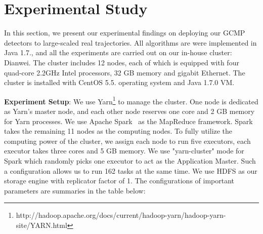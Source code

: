 \section{Experimental Study}
\label{sec:exp}
In this section, we present our experimental findings on
deploying our GCMP detectors to large-scaled real trajectories.
All algorithms are were implemented in Java 1.7., and all the 
experiments are carried out on our in-house cluster: Dianwei. The cluster
includes 12 nodes, each of which is equipped with four quad-core 2.2GHz Intel processors,
32 GB memory and gigabit Ethernet. The cluster is installed with CentOS 5.5. 
operating system and Java 1.7.0 VM.

\textbf{Experiment Setup}: We use Yarn\footnote{http://hadoop.apache.org/docs/current/hadoop-yarn/hadoop-yarn-site/YARN.html}
to manage the cluster. One node is dedicated as Yarn's master node, and each other node reserves one core and 2 GB memory for
Yarn processes. We use Apache Spark~\cite{zaharia2012resilient} as the MapReduce framework. Spark takes
the remaining 11 nodes as the computing nodes.
To fully utilize the computing power of the cluster, 
we assign each node to run five executors, each executor takes three cores and 5 GB memory. We use "yarn-cluster" mode
for Spark which randomly picks one executor to act as the Application Master. Such a configuration allows us to run 162 tasks
at the same time. We use HDFS as our storage engine with replicator factor of 1.
The configurations of important parameters are summaries in the table below:



